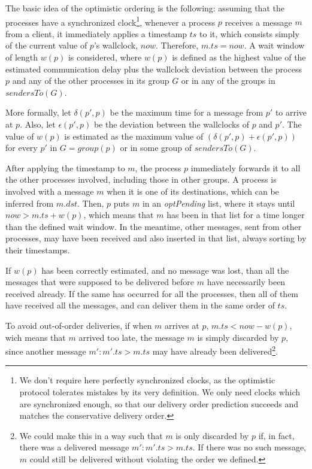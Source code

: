 \documentclass[times, 10pt]{article}
\begin{document}
The basic idea of the optimistic ordering is the following: assuming that the processes have a synchronized clock\footnote{We don't require here perfectly synchronized clocks, as the optimistic protocol tolerates mistakes by its very definition. We only need clocks which are synchronized enough, so that our delivery order prediction succeeds and matches the conservative delivery order.}, whenever a process $p$ receives a message $m$ from a client, it immediately applies a timestamp $ts$ to it, which consists simply of the current value of $p$'s wallclock, $now$. Therefore, $m.ts=now$. A wait window of length $w(p)$ is considered, where $w(p)$ is defined as the highest value of the estimated communication delay plus the wallclock deviation between the process $p$ and any of the other processes in its group $G$ or in any of the groups in $sendersTo(G)$.

More formally, let $\delta(p',p)$ be the maximum time for a message from $p'$ to arrive at $p$. Also, let $\epsilon(p',p)$ be the deviation between the wallclocks of $p$ and $p'$. The value of $w(p)$ is estimated as the maximum value of \mbox{$(\delta(p',p) + \epsilon(p',p))$} for every $p'$ in $G = group(p)$ or in some group of $sendersTo(G)$.

After applying the timestamp to $m$, the process $p$ immediately forwards it to all the other processes involved, including those in other groups. A process is involved with a message $m$ when it is one of its destinations, which can be inferred from $m.dst$. Then, $p$ puts $m$ in an \mbox{\textit{optPending}} list, where it stays until $now>m.ts+w(p)$, which means that $m$ has been in that list for a time longer than the defined wait window. In the meantime, other messages, sent from other processes, may have been received and also inserted in that list, always sorting by their timestamps.

If $w(p)$ has been correctly estimated, and no message was lost, than all the messages that were supposed to be delivered before $m$ have necessarily been received already. If the same has occurred for all the processes, then all of them have received all the messages, and can deliver them in the same order of $ts$.

To avoid out-of-order deliveries, if when $m$ arrives at $p$, \mbox{$m.ts < now - w(p)$}, wich means that $m$ arrived too late, the message $m$ is simply discarded by $p$, since another message $m' : m'.ts > m.ts$ may have already been delivered\footnote{We could make this in a way such that $m$ is only discarded by $p$ if, in fact, there was a delivered message $m' : m'.ts > m.ts$. If there was no such message, $m$ could still be delivered without violating the order we defined.}.
\end{document}
